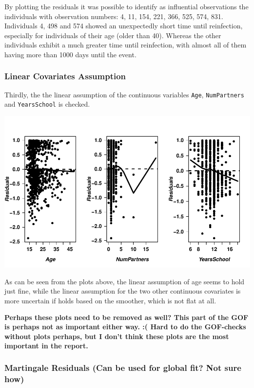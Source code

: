 \documentclass[
]{article}
\begin{document}
By plotting the residuals it was possible to identify as influential observations the individuals with observation numbers: 4, 11, 154, 221, 366, 525, 574, 831. Individuals 4, 498 and 574 showed an unexpectedly short time until reinfection, especially for individuals of their age (older than 40).
Whereas the other individuals exhibit a much greater time until reinfection, with almost all of them having more than 1000 days until the event.

\hypertarget{linear-covariates-assumption}{%
\subsubsection{Linear Covariates Assumption}\label{linear-covariates-assumption}}

Thirdly, the the linear assumption of the continuous variables \texttt{Age}, \texttt{NumPartners} and \texttt{YearsSchool} is checked.

\includegraphics{practical_files/figure-latex/unnamed-chunk-7-1.pdf}

As can be seen from the plots above, the linear assumption of age seems to hold just fine, while the linear assumption for the two other continuous covariates is more uncertain if holds based on the smoother, which is not flat at all.

\textbf{Perhaps these plots need to be removed as well? This part of the GOF is perhaps not as important either way. :( Hard to do the GOF-checks without plots perhaps, but I don't think these plots are the most important in the report.}

\hypertarget{martingale-residuals-can-be-used-for-global-fit-not-sure-how}{%
\subsubsection{Martingale Residuals (Can be used for global fit? Not sure how)}\label{martingale-residuals-can-be-used-for-global-fit-not-sure-how}}
\end{document}
